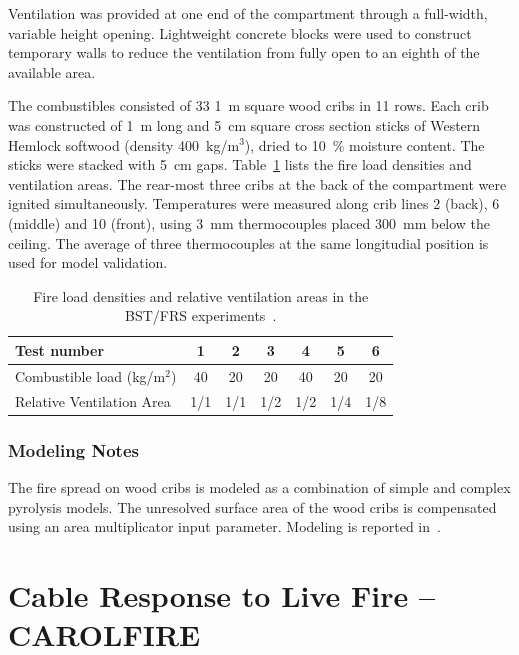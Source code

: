 Ventilation was provided at one end of the compartment through a full-width, variable height opening. Lightweight concrete blocks were used to construct temporary walls to reduce the ventilation from fully open to an eighth of the available area.

The combustibles consisted of 33 1~m square wood cribs in 11 rows. Each crib was constructed of 1~m long and 5~cm square cross section sticks of Western Hemlock softwood (density 400~kg/m$^3$), dried to 10~\% moisture content. The sticks were stacked with 5~cm gaps. Table~\ref{BST_FRS_wood_cribs_tests} lists the fire load densities and ventilation areas. The rear-most three cribs at the back of the compartment were ignited simultaneously. Temperatures were measured along crib lines 2 (back), 6 (middle) and 10 (front), using 3~mm thermocouples placed 300~mm below the ceiling. The average of three thermocouples at the same longitudial position is used for model validation.

\begin{table}[ht]
\begin{center}
\caption[BST/FRS test cases]{Fire load densities and relative ventilation areas in the BST/FRS experiments~\cite{BST_FRS:1994}.}
\label{BST_FRS_wood_cribs_tests}
\begin{tabular}{|l|c|c|c|c|c|c|}
\hline
Test number                     & 1   & 2   & 3   & 4   & 5  & 6  \\ \hline \hline 
Combustible load (kg/m$^2$)     & 40  & 20  & 20  & 40  & 20 & 20 \\
Relative Ventilation Area       & 1/1 & 1/1 & 1/2 & 1/2 & 1/4 & 1/8 \\ \hline
\end{tabular}
\end{center}
\end{table}

\subsubsection{Modeling Notes}

The fire spread on wood cribs is modeled as a combination of simple and complex pyrolysis models. The unresolved surface area of the wood cribs is compensated using an area multiplicator input parameter. Modeling is reported in~\cite{Janardhan:FSJ2021}.


\section{Cable Response to Live Fire -- CAROLFIRE}
\label{CAROLFIRE_Description}

